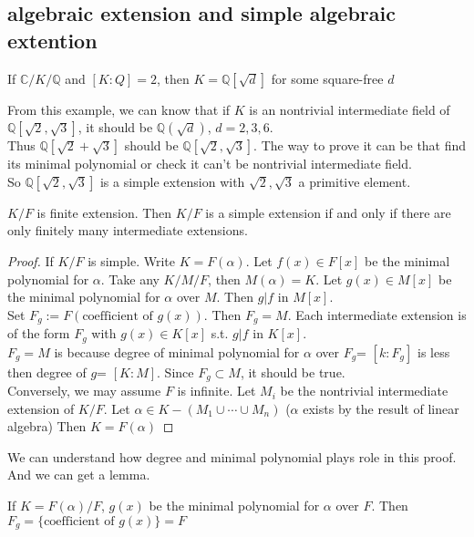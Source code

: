 \subsection{algebraic extension and simple algebraic extention}
\begin{example}
    If  $ \mathbb{C}/K/\mathbb{Q} $ and  $ [K:Q]=2 $, then  $ K=\mathbb{Q}[\sqrt{d}] $ for some square-free  $ d $   
\end{example}
From this example, we can know that if  $ K  $ is an nontrivial intermediate field of  $ \mathbb{Q}[\sqrt{2},\sqrt{3}] $, it should be   $ \mathbb{Q}(\sqrt{d}) $,  $ d=2,3,6 $.\\
Thus  $ \mathbb{Q}[\sqrt{2}+\sqrt{3}] $ should be  $ \mathbb{Q}[\sqrt{2},\sqrt{3}] $. The way to prove it can be that find its minimal polynomial or check it can't be nontrivial intermediate field.\\
So  $ \mathbb{Q}[\sqrt{2},\sqrt{3}] $ is a simple extension with  $ \sqrt{2},\sqrt{3} $ a primitive element.
\begin{proposition}
     $ K/F  $ is finite extension. Then  $ K/F  $ is a simple extension if and only if there are only finitely many intermediate extensions.\label{criterion for simple extension}
\end{proposition} 
\begin{proof}
    If  $ K/F  $ is simple. Write  $ K=F(\alpha) $. Let  $ f(x)\in F[x]  $ be the minimal polynomial for  $ \alpha $. Take any  $ K/M/F $, then  $ M(\alpha)=K $. Let  $ g(x)\in M[x]  $ be the minimal polynomial for  $ \alpha $ over  $ M  $. Then  $ g|f $ in  $ M[x] $.\\
    Set  $ F_g:=F(\text{coefficient of } g(x)) $. Then  $ F_g=M $. Each intermediate extension is of the form  $ F_g  $ with  $ g(x)\in K[x] $ s.t.  $ g|f $ in  $ K[x] $.\\
     $ F_g=M  $ is because degree of minimal polynomial for  $ \alpha  $ over  $ F_g $= $ [k:F_g] $ is less then degree of  $ g  $= $ [K:M] $. Since  $ F_g\subset M $, it should be true.\\
     Conversely, we may assume  $ F  $ is infinite. Let  $ M_i  $ be the nontrivial intermediate extension of  $ K/F $. Let  $ \alpha\in K-(M_1\cup\cdots\cup M_n) $ ($ \alpha  $ exists by the result of linear algebra)  Then  $ K=F(\alpha) $         
\end{proof}    
\begin{remark}
    We can understand how degree and minimal polynomial plays role in this proof. And we can get a lemma.
\end{remark}
\begin{lemma}
    If  $ K=F(\alpha)/F $,  $ g(x)  $ be the minimal polynomial for  $ \alpha $  over  $ F  $. Then  $ F_g=\{\text{coefficient of } g(x) \}=F $  
\end{lemma}
